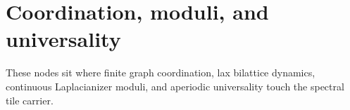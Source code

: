 \section{Coordination, moduli, and universality}

These nodes sit where finite graph coordination, lax bilattice dynamics,
continuous Laplacianizer moduli, and aperiodic universality touch the spectral
tile carrier.





